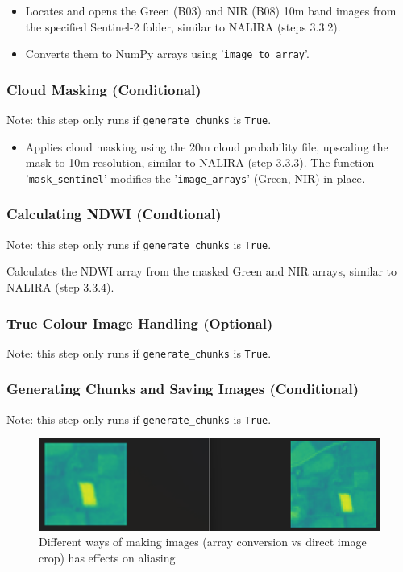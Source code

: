 \begin{itemize}
    \item Locates and opens the Green (B03) and NIR (B08) 10m band images from the specified Sentinel-2 folder, similar to NALIRA (steps 3.3.2).
    \item Converts them to NumPy arrays using '\verb|image_to_array|'.
\end{itemize}

\subsubsection{Cloud Masking (Conditional)}
Note: this step only runs if \verb|generate_chunks| is \verb|True|.

\begin{itemize}
    \item Applies cloud masking using the 20m cloud probability file, upscaling the mask to 10m resolution, similar to NALIRA (step 3.3.3). The function '\verb|mask_sentinel|' modifies the '\verb|image_arrays|' (Green, NIR) in place.
\end{itemize}

\subsubsection{Calculating NDWI (Condtional)}
Note: this step only runs if \verb|generate_chunks| is \verb|True|.

Calculates the NDWI array from the masked Green and NIR arrays, similar to NALIRA (step 3.3.4).

\subsubsection{True Colour Image Handling (Optional)}
Note: this step only runs if \verb|generate_chunks| is \verb|True|. 

\subsubsection{Generating Chunks and Saving Images (Conditional)}
Note: this step only runs if \verb|generate_chunks| is \verb|True|.

\begin{figure}
    \centering
    \includegraphics[width=0.5\linewidth]{contents/figures/ME different way of making images.jpg}
    \caption{Different ways of making images (array conversion vs direct image crop) has effects on aliasing}
    \label{fig:ME different image methods}
\end{figure}

